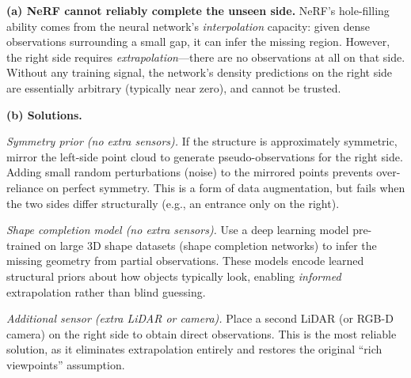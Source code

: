 \documentclass[12pt]{article}
\begin{document}
\begin{answerbox}
\textbf{(a) NeRF cannot reliably complete the unseen side.}
NeRF's hole-filling ability comes from the neural network's \emph{interpolation}
capacity: given dense observations surrounding a small gap, it can infer the
missing region. However, the right side requires \emph{extrapolation}---there
are no observations at all on that side. Without any training signal,
the network's density predictions on the right side are essentially arbitrary
(typically near zero), and cannot be trusted.

\medskip
\textbf{(b) Solutions.}

\textit{Symmetry prior (no extra sensors).}
If the structure is approximately symmetric, mirror the left-side point cloud
to generate pseudo-observations for the right side. Adding small random
perturbations (noise) to the mirrored points prevents over-reliance on perfect
symmetry. This is a form of data augmentation, but fails when the two sides
differ structurally (e.g., an entrance only on the right).

\textit{Shape completion model (no extra sensors).}
Use a deep learning model pre-trained on large 3D shape datasets (shape
completion networks) to infer the missing geometry from partial observations.
These models encode learned structural priors about how objects typically look,
enabling \emph{informed} extrapolation rather than blind guessing.

\textit{Additional sensor (extra LiDAR or camera).}
Place a second LiDAR (or RGB-D camera) on the right side to obtain direct
observations. This is the most reliable solution, as it eliminates
extrapolation entirely and restores the original ``rich viewpoints''
assumption.
\end{answerbox}
\end{document}
